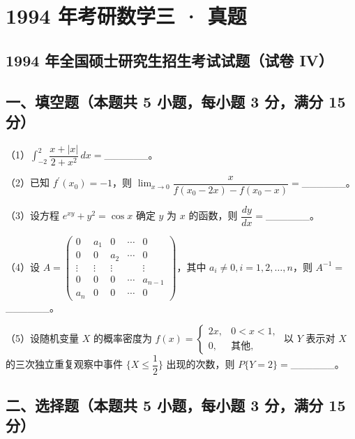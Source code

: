 \documentclass[UTF8,12pt]{ctexart}
\begin{document}
\section*{1994 年考研数学三 · 真题}
\subsection*{1994 年全国硕士研究生招生考试试题（试卷 IV）}

\subsection*{一、填空题（本题共 5 小题，每小题 3 分，满分 15 分）}

（1）\(\displaystyle \int_{-2}^2\dfrac{\displaystyle x+|x|}{\displaystyle 2+x^2}\,dx=\)\_\_\_\_\_\_。


（2）已知 \(\displaystyle f^{\prime}(x_0)=-1\)，则 \(\displaystyle \lim_{x\to0}\dfrac{\displaystyle x}{\displaystyle f(x_0-2x)-f(x_0-x)}=\)\_\_\_\_\_\_。


（3）设方程 \(\displaystyle e^{xy}+y^2=\cos x\) 确定 \(\displaystyle y\) 为 \(\displaystyle x\) 的函数，则 \(\displaystyle \dfrac{\displaystyle dy}{\displaystyle dx}=\)\_\_\_\_\_\_。


（4）设 \(\displaystyle A=\begin{pmatrix}0&a_1&0&\cdots&0\\0&0&a_2&\cdots&0\\\vdots&\vdots&\vdots&&\vdots\\0&0&0&\cdots&a_{n-1}\\a_n&0&0&\cdots&0\end{pmatrix}\)，其中 \(\displaystyle a_i\ne0,\allowbreak  i=1,\allowbreak 2,\allowbreak \ldots,\allowbreak n\)，则 \(\displaystyle A^{-1}=\)\_\_\_\_\_\_。


（5）设随机变量 \(\displaystyle X\) 的概率密度为 \(\displaystyle f(x)=\begin{cases}2x,\allowbreak &0<x<1,\allowbreak \\0,\allowbreak &\text{其他},\allowbreak \end{cases}\) 以 \(\displaystyle Y\) 表示对 \(\displaystyle X\) 的三次独立重复观察中事件 \(\displaystyle \{X\leq\dfrac{\displaystyle 1}{\displaystyle 2}\}\) 出现的次数，则 \(\displaystyle P\{Y=2\}=\)\_\_\_\_\_\_。


\subsection*{二、选择题（本题共 5 小题，每小题 3 分，满分 15 分）}
\end{document}
